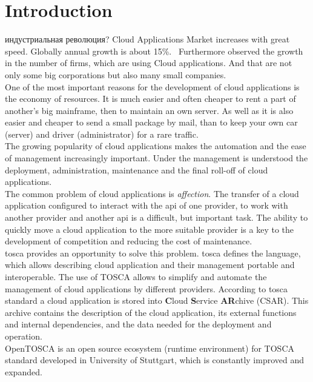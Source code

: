 
\chapter{Introduction}
индустриальная революция?
\fi
Cloud Applications Market increases with great speed. 
Globally annual growth is about 15\%.~\cite*{statista_global}
Furthermore observed the growth in the number of firms, which are using Cloud applications. 
And that are not only some big corporations but also many small companies.~\cite*{destatis_2014, destatis_2016} \\ 
One of the most important reasons for the development of cloud applications is the economy of resources.
It is much easier and often cheaper to rent a part of another's big mainframe, then to maintain an own server.
As well as it is also easier and cheaper to send a small package by mail, than to keep your own car (server) and driver (administrator) for a rare traffic.\\ 
The growing popularity of cloud applications makes the automation and the ease of management increasingly important.
Under the management is understood the deployment, administration, maintenance and the final roll-off of cloud applications.\\
The common problem of cloud applications is \emph{affection}. 
The transfer of a cloud application configured to interact with the \gls{api} of one provider, to work with another provider and another \gls{api} is a difficult, but important task. 
The ability to quickly move a cloud application to the more suitable provider is a key to the development of competition and reducing the cost of maintenance.\\ %
\gls{tosca} \cite*{TOSCA-v1.0} provides an opportunity to solve this problem. 
\gls{tosca} defines the language, which allows describing cloud application and their management portable and interoperable. 
The use of TOSCA allows to simplify and automate the management of cloud applications by different providers. 
According to \gls{tosca} standard a cloud application is stored into \textbf{C}loud \textbf{S}ervice \textbf{AR}chive (CSAR).
This archive contains the description of the cloud application, its external functions and internal dependencies, and the data needed for the deployment and operation.\\
OpenTOSCA \cite*{OpenTOSCA} is an open source ecosystem (runtime environment) for TOSCA standard developed in University of Stuttgart, which is constantly improved and expanded.
